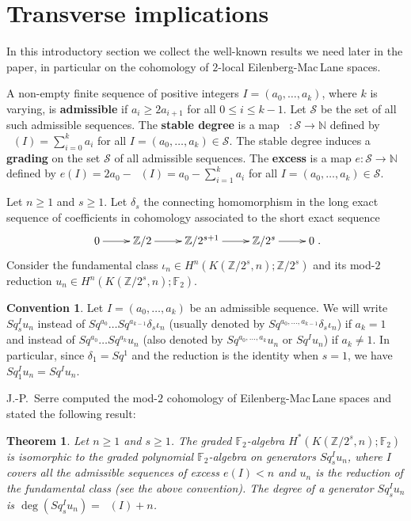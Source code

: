 \documentclass{amsart}
\newtheorem{thm}{Theorem}[section]
\theoremstyle{definition}
\newtheorem*{conv*}{Convention}
\theoremstyle{remark}
\DeclareMathOperator{\degst}{deg_{st}}
\newcommand{\N}{\mathbb{N}}
\newcommand{\Z}{\mathbb{Z}}
\newcommand{\F}{\mathbb{F}}
\renewcommand{\geq}{\geqslant}
\renewcommand{\leq}{\leqslant}
\begin{document}
\section{Transverse implications}\label{s:transverse}

In this introductory section we collect the well-known results we need later in the paper, in particular on the cohomology of $2$-local Eilenberg-Mac\,Lane spaces.

A non-empty finite sequence of positive integers $I=(a_0,\dots,a_k)$, where $k$ is varying, is {\bf admissible} if $a_i\geq2a_{i+1}$ for all $0\leq i\leq k-1$. Let $\mathcal S$ be the set of all such admissible sequences. The {\bf stable degree} is a map $\degst:{\mathcal S}\to\N$ defined by $\degst(I)=\sum_{i=0}^k a_i$ for all $I=(a_0,\dots,a_k)\in{\mathcal S}$. The stable degree induces a {\bf grading} on the set $\mathcal S$ of all admissible sequences. The {\bf excess} is a map $e:{\mathcal S}\to\N$ defined by $e(I)=2a_0-\degst(I)=a_0-\sum_{i=1}^k a_i$ for all $I=(a_0,\dots,a_k)\in{\mathcal S}$.

Let $n\geq1$ and $s\geq1$. Let $\delta_s$ the connecting homomorphism in the long exact sequence of coefficients in cohomology associated to the short exact sequence
$$\xymatrix{0\ar[r] &\Z/2\ar[r] &\Z/2^{s+1}\ar[r] &\Z/2^s\ar[r] &0}.$$ 
Consider the fundamental class $\iota_n\in H^n(K(\Z/2^s,n);\Z/2^s)$ and its mod-$2$ reduction $u_n\in H^n(K(\Z/2^s,n);\F_2)$. 
\begin{conv*}
Let $I=(a_0,\dots,a_k)$ be an admissible sequence. We will write $Sq^I_s u_n$ instead of $Sq^{a_0}\dots Sq^{a_{k-1}}\delta_s\iota_n$ (usually denoted by $Sq^{a_0,\dots,a_{k-1}}\delta_s\iota_n$) if $a_k=1$ and instead of $Sq^{a_0}\dots Sq^{a_k} u_n$ (also denoted by $Sq^{a_0,\dots,a_k} u_n$ or $Sq^I u_n$) if $a_k\not=1$. In particular, since $\delta_1=Sq^1$ and the reduction is the identity when $s=1$, we have $Sq^I_1 u_n=Sq^I u_n$.
\end{conv*}

J.-P.~Serre \cite{Se53} computed the mod-$2$ cohomology of Eilenberg-Mac\,Lane spaces and stated the following result:


\begin{thm}
Let $n\geq1$ and $s\geq1$. The graded $\F_2$-algebra $H^*(K(\Z/2^s,n);\F_2)$ is isomorphic to the graded polynomial $\F_2$-algebra on generators $Sq^I_s u_n$, where $I$ covers all the admissible sequences of excess $e(I)<n$ and $u_n$ is the reduction of the fundamental class (see the above convention). The degree of a generator $Sq^I_s u_n$ is $\deg(Sq^I_s u_n)=\degst(I)+n$. 
\end{thm}
\end{document}
